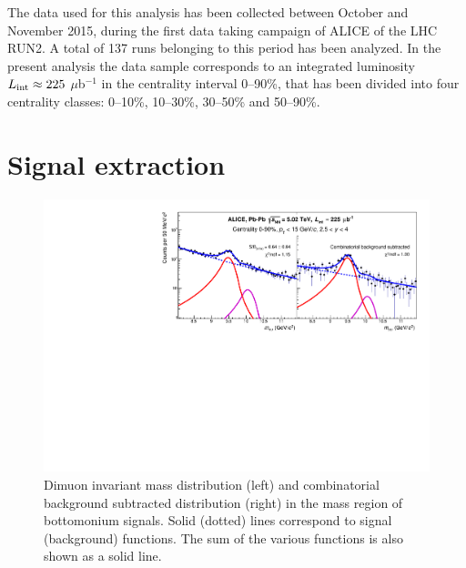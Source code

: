 The data used for this analysis has been collected between October and November 2015, during the first \pbpb data taking campaign of ALICE of the  LHC RUN2.
A total of 137 runs belonging to this period has been analyzed.
In the present analysis the data sample corresponds to an integrated luminosity $L_{\rm int}\approx 225$ $\mu$b$^{-1}$ in the centrality interval 0--90\%, that has been divided into four centrality classes: 0--10\%, 10--30\%, 30--50\% and 50--90\%.

\section{Signal extraction}

\begin{figure}[!b]
\begin{center}
\includegraphics[width=0.8\linewidth]{Chapters/Analysis/Figs/InvMass_Upsilon_Performance_Ylog.pdf}
\caption{Dimuon invariant mass distribution (left) and combinatorial background subtracted distribution (right) in the mass region of bottomonium signals. Solid (dotted) lines correspond to signal (background) functions. The sum of the various functions is also shown as a solid line.}
\label{fig:mass_dist}
\end{center}
\end{figure}

